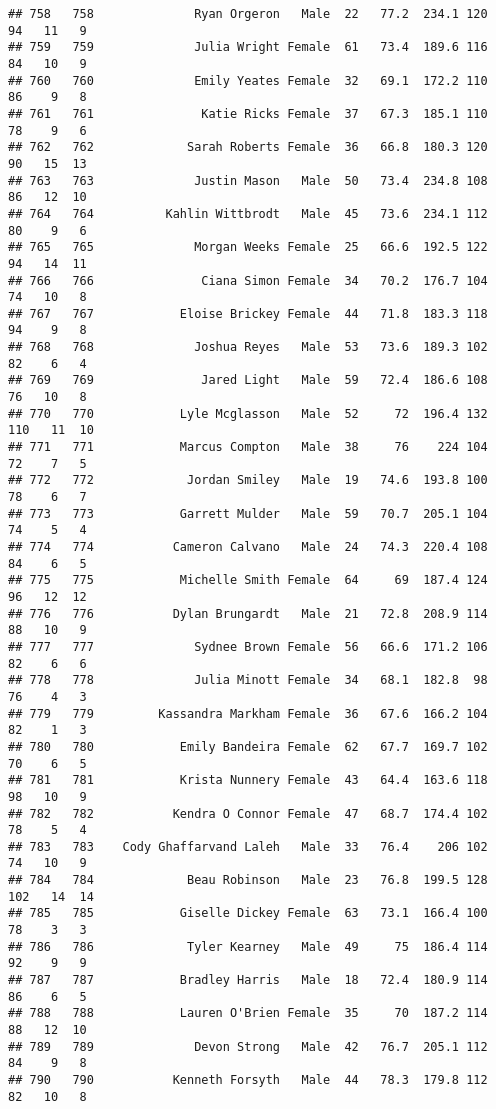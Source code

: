 \documentclass[
]{article}
\begin{document}
\begin{verbatim}
## 758   758              Ryan Orgeron   Male  22   77.2  234.1 120  94   11   9
## 759   759              Julia Wright Female  61   73.4  189.6 116  84   10   9
## 760   760              Emily Yeates Female  32   69.1  172.2 110  86    9   8
## 761   761               Katie Ricks Female  37   67.3  185.1 110  78    9   6
## 762   762             Sarah Roberts Female  36   66.8  180.3 120  90   15  13
## 763   763              Justin Mason   Male  50   73.4  234.8 108  86   12  10
## 764   764          Kahlin Wittbrodt   Male  45   73.6  234.1 112  80    9   6
## 765   765              Morgan Weeks Female  25   66.6  192.5 122  94   14  11
## 766   766               Ciana Simon Female  34   70.2  176.7 104  74   10   8
## 767   767            Eloise Brickey Female  44   71.8  183.3 118  94    9   8
## 768   768              Joshua Reyes   Male  53   73.6  189.3 102  82    6   4
## 769   769               Jared Light   Male  59   72.4  186.6 108  76   10   8
## 770   770            Lyle Mcglasson   Male  52     72  196.4 132 110   11  10
## 771   771            Marcus Compton   Male  38     76    224 104  72    7   5
## 772   772             Jordan Smiley   Male  19   74.6  193.8 100  78    6   7
## 773   773            Garrett Mulder   Male  59   70.7  205.1 104  74    5   4
## 774   774           Cameron Calvano   Male  24   74.3  220.4 108  84    6   5
## 775   775            Michelle Smith Female  64     69  187.4 124  96   12  12
## 776   776           Dylan Brungardt   Male  21   72.8  208.9 114  88   10   9
## 777   777              Sydnee Brown Female  56   66.6  171.2 106  82    6   6
## 778   778              Julia Minott Female  34   68.1  182.8  98  76    4   3
## 779   779         Kassandra Markham Female  36   67.6  166.2 104  82    1   3
## 780   780            Emily Bandeira Female  62   67.7  169.7 102  70    6   5
## 781   781            Krista Nunnery Female  43   64.4  163.6 118  98   10   9
## 782   782           Kendra O Connor Female  47   68.7  174.4 102  78    5   4
## 783   783    Cody Ghaffarvand Laleh   Male  33   76.4    206 102  74   10   9
## 784   784             Beau Robinson   Male  23   76.8  199.5 128 102   14  14
## 785   785            Giselle Dickey Female  63   73.1  166.4 100  78    3   3
## 786   786             Tyler Kearney   Male  49     75  186.4 114  92    9   9
## 787   787            Bradley Harris   Male  18   72.4  180.9 114  86    6   5
## 788   788            Lauren O'Brien Female  35     70  187.2 114  88   12  10
## 789   789              Devon Strong   Male  42   76.7  205.1 112  84    9   8
## 790   790           Kenneth Forsyth   Male  44   78.3  179.8 112  82   10   8

\end{verbatim}
\end{document}
